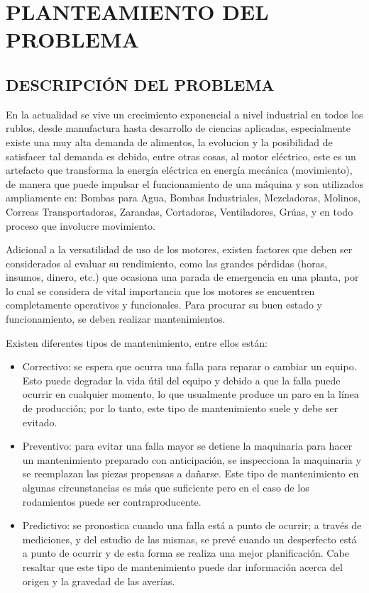 \thispagestyle{empty}
\setcounter{page}{5}

\section{PLANTEAMIENTO DEL PROBLEMA}

\subsection{DESCRIPCIÓN DEL PROBLEMA}

En la actualidad se vive un crecimiento exponencial a nivel industrial en todos
los rublos, desde manufactura hasta desarrollo de ciencias aplicadas,  especialmente
existe una muy alta demanda de alimentos, la evolucion y la posibilidad de
satisfacer tal demanda es debido, entre
otras cosas, al motor eléctrico, este es un artefacto que transforma la
energía eléctrica en energía mecánica (movimiento), de manera que puede
impulsar el funcionamiento de una máquina y son utilizados ampliamente en:
Bombas para Agua, Bombas Industriales, Mezcladoras, Molinos, Correas
Transportadoras, Zarandas, Cortadoras, Ventiladores, Grúas, y en todo proceso
que involucre movimiento.

Adicional a la versatilidad de uso de los motores, existen factores que deben ser
considerados al evaluar su rendimiento, como las grandes pérdidas
(horas, insumos, dinero, etc.) que ocasiona una parada
de emergencia en una planta, por lo cual se considera de vital importancia que
los motores se encuentren completamente operativos y funcionales. Para
procurar su buen estado y funcionamiento, se deben realizar mantenimientos.

Existen diferentes tipos de mantenimiento, entre ellos están:
\begin{itemize}

\item{Correctivo: se espera que ocurra una falla para reparar o cambiar un
    equipo. Esto puede degradar la vida útil del equipo y debido a que la falla
        puede ocurrir en cualquier momento, lo que usualmente produce un paro en la
        línea de producción; por lo tanto, este tipo de mantenimiento suele y
        debe ser evitado.}

\item{Preventivo: para evitar una falla mayor se detiene la maquinaria para
    hacer un mantenimiento preparado con anticipación, se inspecciona la
        maquinaria y se reemplazan las piezas propensas a dañarse. Este tipo de
        mantenimiento en algunas circunstancias es más que suficiente pero en
        el caso de los rodamientos puede ser contraproducente.}

\item{Predictivo: se pronostica cuando una falla está a punto de ocurrir; a
    través de mediciones, y del estudio de las mismas, se prevé cuando un
        desperfecto está a punto de ocurrir y de esta forma se realiza una
        mejor planificación. Cabe resaltar que este tipo de mantenimiento puede
        dar información acerca del origen y la gravedad de las averías.}

\end{itemize}

